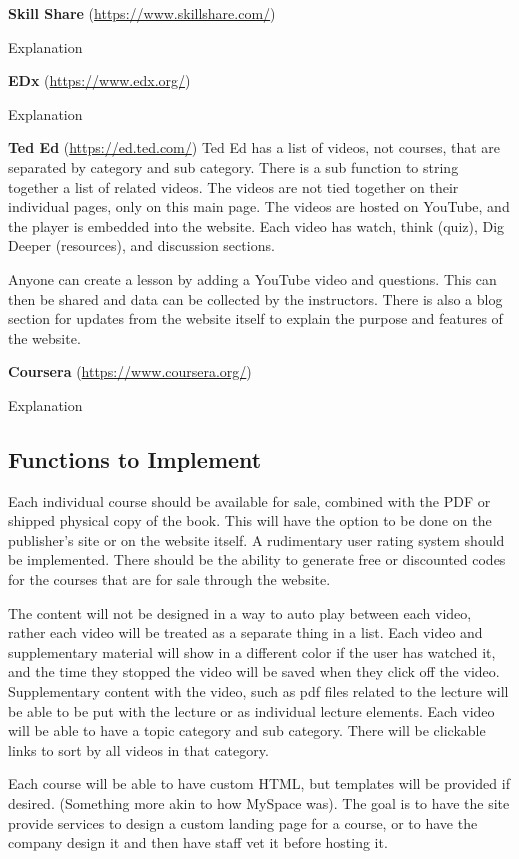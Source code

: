 \documentclass{article}
\begin{document}
\textbf{Skill Share} (\url{https://www.skillshare.com/})

Explanation

\textbf{EDx} (\url{https://www.edx.org/})

Explanation

\textbf{Ted Ed} (\url{https://ed.ted.com/})
Ted Ed has a list of videos, not courses, that are separated by category and sub category. There is a sub function to string together a list of related videos. The videos are not tied together on their individual pages, only on this main page. The videos are hosted on YouTube, and the player is embedded into the website. Each video has watch, think (quiz), Dig Deeper (resources), and discussion sections.

Anyone can create a lesson by adding a YouTube video and questions. This can then be shared and data can be collected by the instructors. There is also a blog section for updates from the website itself to explain the purpose and features of the website.

\textbf{Coursera} (\url{https://www.coursera.org/})

Explanation

\subsection{Functions to Implement}

Each individual course should be available for sale, combined with the PDF or shipped physical copy of the book. This will have the option to be done on the publisher's site or on the website itself. A rudimentary user rating system should be implemented. There should be the ability to generate free or discounted codes for the courses that are for sale through the website.

The content will not be designed in a way to auto play between each video, rather each video will be treated as a separate thing in a list. Each video and supplementary material will show in a different color if the user has watched it, and the time they stopped the video will be saved when they click off the video. Supplementary content with the video, such as pdf files related to the lecture will be able to be put with the lecture or as individual lecture elements. Each video will be able to have a topic category and sub category. There will be clickable links to sort by all videos in that category.

Each course will be able to have custom HTML, but templates will be provided if desired. (Something more akin to how MySpace was). The goal is to have the site provide services to design a custom landing page for a course, or to have the company design it and then have staff vet it before hosting it.
\end{document}
